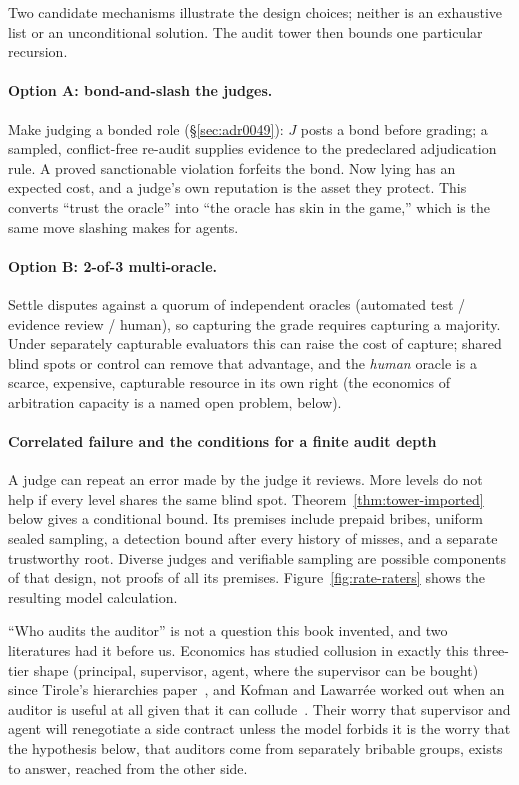 \documentclass[11pt,a4paper]{article}
\theoremstyle{definition}
\begin{document}
\noindent Two candidate mechanisms illustrate the design choices; neither is an exhaustive
list or an unconditional solution. The audit tower then bounds one particular
recursion.

\paragraph{Option A: bond-and-slash the judges.}
Make judging a bonded role (\S\ref{sec:adr0049}): $J$ posts a bond before grading;
a sampled, conflict-free re-audit supplies evidence to the predeclared
adjudication rule. A proved sanctionable violation forfeits the bond. Now lying has an expected cost, and a judge's own
reputation is the asset they protect. This converts ``trust the oracle'' into
``the oracle has skin in the game,'' which is the same move slashing makes for
agents.

\paragraph{Option B: 2-of-3 multi-oracle.}
Settle disputes against a quorum of independent oracles (automated test / evidence
review / human), so capturing the grade requires capturing a majority. Under separately capturable evaluators this can raise the cost of capture;
shared blind spots or control can remove that advantage, and the \emph{human} oracle is a
scarce, expensive, capturable resource in its own right (the economics of
arbitration capacity is a named open problem, below).

\paragraph{Correlated failure and the conditions for a finite audit depth}
A judge can repeat an error made by the judge it reviews. More levels do not help if every level shares the same blind spot. Theorem~\ref{thm:tower-imported} below gives a conditional bound. Its premises include prepaid bribes, uniform sealed sampling, a detection bound after every history of misses, and a separate trustworthy root. Diverse judges and verifiable sampling are possible components of that design, not proofs of all its premises. Figure~\ref{fig:rate-raters} shows the resulting model calculation.

``Who audits the auditor'' is not a question
this book invented, and two literatures had it before us. Economics has studied
collusion in exactly this three-tier shape (principal, supervisor, agent,
where the supervisor can be bought) since Tirole's hierarchies
paper~, and Kofman and Lawarrée worked out when an auditor is
useful at all given that it can collude~. Their
worry that supervisor and agent will renegotiate a side contract unless the
model forbids it is the worry that the hypothesis below, that auditors come
from separately bribable groups, exists to answer, reached from the other side.
\end{document}
